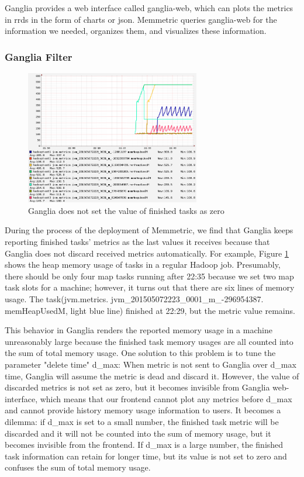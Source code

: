 Ganglia provides a web interface called ganglia-web, which can plots the metrics in rrds in the form of charts or json. Memmetric queries ganglia-web for the information we needed, organizes them, and visualizes these information. 

\subsubsection{Ganglia Filter}

\begin{figure}[ht]
  \centering
    \includegraphics[width=3.0in]{image/ganglia_finished_tasks.png}
    \caption{Ganglia does not set the value of finished tasks as zero}
    \label{ref:gangliah_bug}
\end{figure}

During the process of the deployment of Memmetric, we find that Ganglia keeps reporting finished tasks' metrics as the last values it receives because that Ganglia does not discard received metrics automatically. For example, Figure \ref{ref:gangliah_bug} shows the heap memory usage of tasks in a regular Hadoop job. Presumably, there should be only four map tasks running after 22:35 because we set two map task slots for a machine; however, it turns out that there are six lines of memory usage. The task(jvm.metrics. jvm\_201505072223\_0001\_m\_-296954387. memHeapUsedM, light blue line) finished at 22:29, but the metric value remains.

This behavior in Ganglia renders the reported memory usage in a machine unreasonably large because the finished task memory usages are all counted into the sum of total memory usage. One solution to this problem is to tune the parameter "delete time" d\_max: When metric is not sent to Ganglia over d\_max time, Ganglia will assume the metric is dead and discard it. However, the value of discarded metrics is not set as zero, but it becomes invisible from Ganglia web-interface, which means that our frontend cannot plot any metrics before d\_max and cannot provide history memory usage information to users. It becomes a dilemma: if d\_max is set to a small number, the finished task metric will be discarded and it will not be counted into the sum of memory usage, but it becomes invisible from the frontend. If d\_max is a large number, the finished task information can retain for longer time, but its value is not set to zero and confuses the sum of total memory usage.


